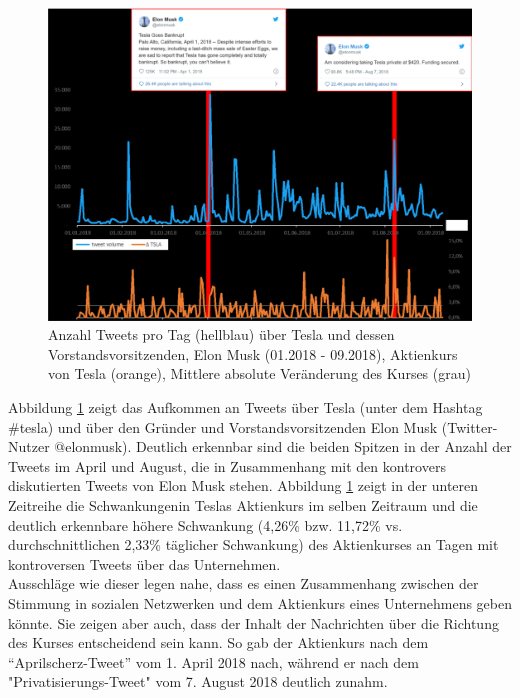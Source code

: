 \documentclass[
	a4paper,
	12pt,
	bibliography=totocnumbered,
	twoside,
]{scrreprt}
\begin{document}
\begin{Beispiel}
	\label{bsp:introduction}

	\begin{figure}[H]
		\centering
		\includegraphics[width=\textwidth]{images/intro_example_tesla_2018_conversation_volume_vs_stock.eps}
		\caption[Tweet-Volumen über Tesla]{Anzahl Tweets pro Tag (hellblau) über Tesla und dessen Vorstandsvorsitzenden, Elon Musk (01.2018 - 09.2018), Aktienkurs von Tesla (orange), Mittlere absolute Veränderung des Kurses (grau)}
		\label{img:tesla-2018}
	\end{figure}

	Abbildung \ref{img:tesla-2018} zeigt das Aufkommen an Tweets über Tesla (unter dem Hashtag \#tesla) und über den Gründer und Vorstandsvorsitzenden Elon Musk (Twitter-Nutzer @elonmusk). Deutlich erkennbar sind die beiden Spitzen in der Anzahl der Tweets im April und August, die in Zusammenhang mit den kontrovers diskutierten Tweets von Elon Musk stehen. Abbildung \ref{img:tesla-2018} zeigt in der unteren Zeitreihe die Schwankungen\footnotemark in Teslas Aktienkurs im selben Zeitraum und die deutlich erkennbare höhere Schwankung (4,26\% bzw. 11,72\% vs. durchschnittlichen 2,33\% täglicher Schwankung) des Aktienkurses an Tagen mit kontroversen Tweets über das Unternehmen.\\

	Ausschläge wie dieser legen nahe, dass es einen Zusammenhang zwischen der Stimmung in sozialen Netzwerken und dem Aktienkurs eines Unternehmens geben könnte. Sie zeigen aber auch, dass der Inhalt der Nachrichten über die Richtung des Kurses entscheidend sein kann. So gab der Aktienkurs nach dem "`Aprilscherz-Tweet"' vom 1. April 2018 nach, während er nach dem "Privatisierungs-Tweet" vom 7. August 2018 deutlich zunahm.
\end{Beispiel}
\end{document}
